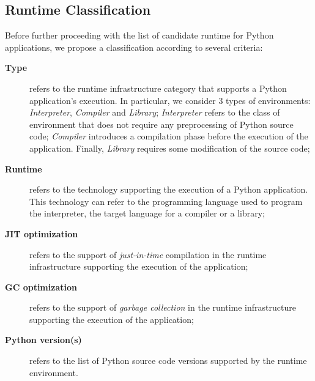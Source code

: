 \subsection{Runtime Classification}
Before further proceeding with the list of candidate runtime for Python applications, we propose a classification according to several criteria:
\begin{description}
      \item[\bf Type] refers to the runtime infrastructure category that supports a Python application's execution.
            In particular, we consider 3 types of environments: \emph{Interpreter}, \emph{Compiler} and \emph{Library};
            \emph{Interpreter} refers to the class of environment that does not require any preprocessing of Python source code;
            \emph{Compiler} introduces a compilation phase before the execution of the application.
            Finally, \emph{Library} requires some modification of the source code;
      \item[\bf Runtime] refers to the technology supporting the execution of a Python application.
            This technology can refer to the programming language used to program the interpreter, the target language for a compiler or a library;
      \item[\bf JIT optimization] refers to the support of \emph{just-in-time} compilation in the runtime infrastructure supporting the execution of the application;
      \item[\bf GC optimization] refers to the support of \emph{garbage collection} in the runtime infrastructure supporting the execution of the application;
      \item[\bf Python version(s)] refers to the list of Python source code versions supported by the runtime environment.
\end{description}

